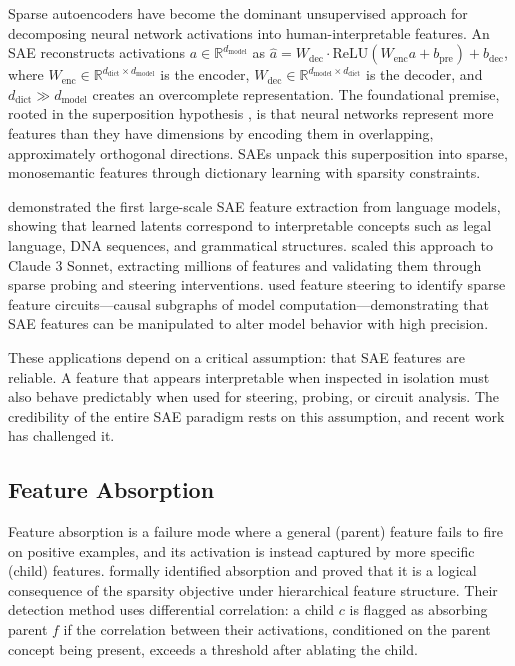 \documentclass{article}
\begin{document}
Sparse autoencoders have become the dominant unsupervised approach for decomposing neural network activations into human-interpretable features. An SAE reconstructs activations $a \in \mathbb{R}^{d_{\text{model}}}$ as $\hat{a} = W_{\text{dec}} \cdot \text{ReLU}(W_{\text{enc}} a + b_{\text{pre}}) + b_{\text{dec}}$, where $W_{\text{enc}} \in \mathbb{R}^{d_{\text{dict}} \times d_{\text{model}}}$ is the encoder, $W_{\text{dec}} \in \mathbb{R}^{d_{\text{model}} \times d_{\text{dict}}}$ is the decoder, and $d_{\text{dict}} \gg d_{\text{model}}$ creates an overcomplete representation. The foundational premise, rooted in the superposition hypothesis \citep{elhage2022superposition}, is that neural networks represent more features than they have dimensions by encoding them in overlapping, approximately orthogonal directions. SAEs unpack this superposition into sparse, monosemantic features through dictionary learning with sparsity constraints.

\citet{bricken2023} demonstrated the first large-scale SAE feature extraction from language models, showing that learned latents correspond to interpretable concepts such as legal language, DNA sequences, and grammatical structures. \citet{templeton2024scaling} scaled this approach to Claude 3 Sonnet, extracting millions of features and validating them through sparse probing and steering interventions. \citet{marks2024sparse} used feature steering to identify sparse feature circuits---causal subgraphs of model computation---demonstrating that SAE features can be manipulated to alter model behavior with high precision.

These applications depend on a critical assumption: that SAE features are reliable. A feature that appears interpretable when inspected in isolation must also behave predictably when used for steering, probing, or circuit analysis. The credibility of the entire SAE paradigm rests on this assumption, and recent work has challenged it.

\subsection{Feature Absorption}

Feature absorption is a failure mode where a general (parent) feature fails to fire on positive examples, and its activation is instead captured by more specific (child) features. \citet{chanin2024quantifying} formally identified absorption and proved that it is a logical consequence of the sparsity objective under hierarchical feature structure. Their detection method uses differential correlation: a child $c$ is flagged as absorbing parent $f$ if the correlation between their activations, conditioned on the parent concept being present, exceeds a threshold after ablating the child.
\end{document}
